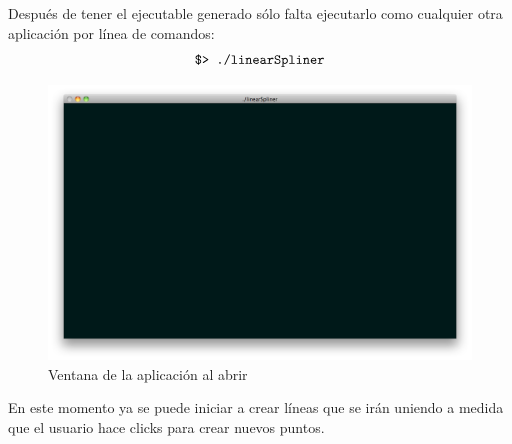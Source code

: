 \documentclass[]{article}
\begin{document}
Después de tener el ejecutable generado sólo falta ejecutarlo como cualquier otra aplicación por línea de comandos:
\[ \verb=$> ./linearSpliner= \]

\begin{figure}[ht] %
   \centering
   \includegraphics[width=\mySize in]{7.png} 
   \caption{Ventana de la aplicación al abrir}
   \label{fig:example}
\end{figure}

En este momento ya se puede iniciar a crear líneas que se irán uniendo a medida que el usuario hace clicks para
crear nuevos puntos.
\end{document}

